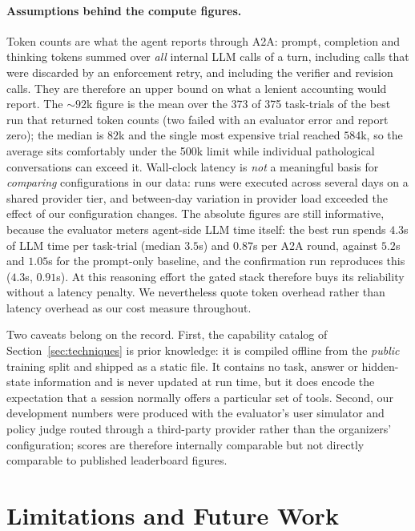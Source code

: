 \documentclass{article}
\begin{document}
\paragraph{Assumptions behind the compute figures.}
Token counts are what the agent reports through A2A: prompt,
completion and thinking tokens summed over \emph{all} internal LLM
calls of a turn, including calls that were discarded by an enforcement
retry, and including the verifier and revision calls. They are
therefore an upper bound on what a lenient accounting would report.
The ${\sim}92$k figure is the mean over the 373 of 375 task-trials of
the best run that returned token counts (two failed with an evaluator
error and report zero); the median is $82$k and the single most
expensive trial reached $584$k, so the average sits comfortably under
the 500k limit while individual pathological conversations can exceed
it. Wall-clock latency is \emph{not} a meaningful basis for
\emph{comparing} configurations in our data: runs were executed across
several days on a shared provider tier, and between-day variation in
provider load exceeded the effect of our configuration changes. The
absolute figures are still informative, because the evaluator meters
agent-side LLM time itself: the best run spends $4.3$s of LLM time per
task-trial (median $3.5$s) and $0.87$s per A2A round, against $5.2$s
and $1.05$s for the prompt-only baseline, and the confirmation run
reproduces this ($4.3$s, $0.91$s). At this reasoning effort the gated
stack therefore buys its reliability without a latency penalty. We
nevertheless quote token overhead rather than latency overhead as our
cost measure throughout.

Two caveats belong on the record. First, the capability catalog of
Section~\ref{sec:techniques} is prior knowledge: it is compiled offline
from the \emph{public} training split and shipped as a static file. It
contains no task, answer or hidden-state information and is never
updated at run time, but it does encode the expectation that a session
normally offers a particular set of tools. Second, our development
numbers were produced with the evaluator's user simulator and policy
judge routed through a third-party provider rather than the organizers'
configuration; scores are therefore internally comparable but not
directly comparable to published leaderboard figures.

\section{Limitations and Future Work}
\end{document}
